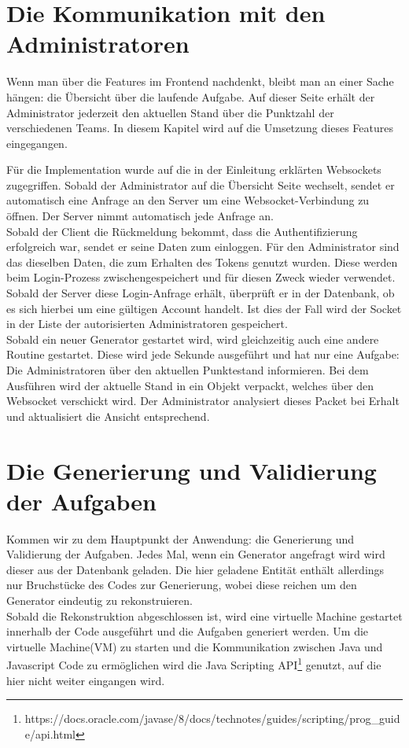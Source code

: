 \section{Die Kommunikation mit den Administratoren}

Wenn man über die Features im Frontend nachdenkt, bleibt man an einer Sache hängen: die Übersicht über die laufende Aufgabe. Auf dieser Seite erhält der Administrator jederzeit den aktuellen Stand über die Punktzahl der verschiedenen Teams. In diesem Kapitel wird auf die Umsetzung dieses Features eingegangen.%

Für die Implementation wurde auf die in der Einleitung erklärten Websockets zugegriffen. Sobald der Administrator auf die Übersicht Seite wechselt, sendet er automatisch eine Anfrage an den Server um eine Websocket-Verbindung zu öffnen. Der Server nimmt automatisch jede Anfrage an. \\
Sobald der Client die Rückmeldung bekommt, dass die Authentifizierung erfolgreich war, sendet er seine Daten zum einloggen. Für den Administrator sind das dieselben Daten, die zum Erhalten des Tokens genutzt wurden. Diese werden beim Login-Prozess zwischengespeichert und für diesen Zweck wieder verwendet. \\
Sobald der Server diese Login-Anfrage erhält, überprüft er in der Datenbank, ob es sich hierbei um eine gültigen Account handelt. Ist dies der Fall wird der Socket in der Liste der autorisierten Administratoren gespeichert. \\

Sobald ein neuer Generator gestartet wird, wird gleichzeitig auch eine andere Routine gestartet. Diese wird jede Sekunde ausgeführt und hat nur eine Aufgabe: Die Administratoren über den aktuellen Punktestand informieren. Bei dem Ausführen wird der aktuelle Stand in ein Objekt verpackt, welches über den Websocket verschickt wird. Der Administrator analysiert dieses Packet bei Erhalt und aktualisiert die Ansicht entsprechend.


\section{Die Generierung und Validierung der Aufgaben}

Kommen wir zu dem Hauptpunkt der Anwendung: die Generierung und Validierung der Aufgaben. Jedes Mal, wenn ein Generator angefragt wird wird dieser aus der Datenbank geladen. Die hier geladene Entität enthält allerdings nur Bruchstücke des Codes zur Generierung, wobei diese reichen um den Generator eindeutig zu rekonstruieren.\\
Sobald die Rekonstruktion abgeschlossen ist, wird eine virtuelle Machine gestartet innerhalb der Code ausgeführt und die Aufgaben generiert werden. Um die virtuelle Machine(VM) zu starten und die Kommunikation zwischen Java und Javascript Code zu ermöglichen wird die Java Scripting API\footnote{https://docs.oracle.com/javase/8/docs/technotes/guides/scripting/prog\_guide/api.html} genutzt, auf die hier nicht weiter eingangen wird. \\

